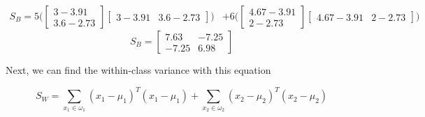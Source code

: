 \documentclass[12pt]{article}
\begin{document}
\begin{align}
    S_B = 5\Big( 
    \begin{bmatrix}
        3 - 3.91 \\
        3.6 - 2.73
    \end{bmatrix} 
    \begin{bmatrix}
        3 - 3.91 & 3.6 - 2.73
    \end{bmatrix}
    \Big)
    &+
    6 \Big( \begin{bmatrix}
        4.67 - 3.91 \\
        2 - 2.73
    \end{bmatrix} 
    \begin{bmatrix}
        4.67 - 3.91 & 2 - 2.73
    \end{bmatrix}
    \Big)
\end{align}
\begin{equation}
    \boxed{
    S_B =
    \begin{bmatrix}
        7.63 & -7.25 \\
        -7.25 & 6.98
    \end{bmatrix}
    }
\end{equation}

Next, we can find the within-class variance with this equation 

\begin{equation}
    S_W = \sum_{x_1 \in \omega_1} (x_1 - \mu_1)^T (x_1 - \mu_1) + \sum_{x_2 \in \omega_2} (x_2 - \mu_2)^T (x_2 - \mu_2)
\end{equation}
\end{document}
